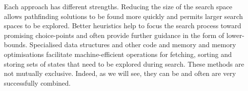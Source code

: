 Each approach has different strengths.  Reducing the size of the search space allows
pathfinding solutions to be found more quickly and permits larger search spaces to be explored.
Better heuristics help to focus the search process toward promising choice-points and often provide
further guidance in the form of lower-bounds. Specialised data structures and other code and memory and
memory optimisations facilitate machine-efficient operations for fetching, sorting and storing sets
of states that need to be explored during search.  These methods are not mutually exclusive.
Indeed, as we will see, they can be and often are very successfully combined.
